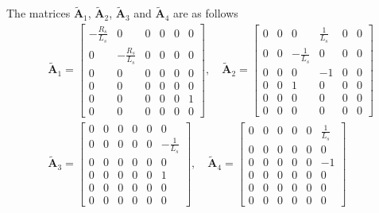 \documentclass[11pt,a4paper]{scrartcl}
\numberwithin{equation}{section}
\theoremstyle{it}
\theoremstyle{definition}
\begin{document}
\begin{onehalfspace}
The matrices $\tilde{\mathbf{A}}_1$, $\tilde{\mathbf{A}}_2$, 
$\tilde{\mathbf{A}}_3$ and $\tilde{\mathbf{A}}_4$ are as follows
\begin{equation}\label{pmsm_problem_1_eq_11}
	\begin{aligned}
		&\tilde{\mathbf{A}}_1 = 
		\begin{bmatrix} 
			-\frac{R_s}{L_s} & 0 & 0 & 0 & 0 & 0 \\[6pt]			
			0 & -\frac{R_s}{L_s} & 0 & 0 & 0 & 0 \\[6pt]
			0 & 0 & 0 & 0 & 0 & 0 \\[6pt]
			0 & 0 & 0 & 0 & 0 & 0 \\[6pt]
			0 & 0 & 0 & 0 & 0 & 1 \\[6pt]
			0 & 0 & 0 & 0 & 0 & 0
		\end{bmatrix},\quad
		\tilde{\mathbf{A}}_2 = 
		\begin{bmatrix} 
			0 & 0 & 0 & \frac{1}{L_s} & 0 & 0 \\[6pt]			
			0 & 0 & -\frac{1}{L_s} & 0 & 0 & 0 \\[6pt]
			0 & 0 & 0 & -1 & 0 & 0 \\[6pt]
			0 & 0 & 1 & 0 & 0 & 0 \\[6pt]
			0 & 0 & 0 & 0 & 0 & 0 \\[6pt]
			0 & 0 & 0 & 0 & 0 & 0
		\end{bmatrix} \\[8pt]
		&\tilde{\mathbf{A}}_3 = 
		\begin{bmatrix} 
			0 & 0 & 0 & 0 & 0 & 0 \\[6pt]			
			0 & 0 & 0 & 0 & 0 & -\frac{1}{L_s} \\[6pt]
			0 & 0 & 0 & 0 & 0 & 0 \\[6pt]
			0 & 0 & 0 & 0 & 0 & 1 \\[6pt]
			0 & 0 & 0 & 0 & 0 & 0 \\[6pt]
			0 & 0 & 0 & 0 & 0 & 0
		\end{bmatrix},\quad
		\tilde{\mathbf{A}}_4 = 
		\begin{bmatrix} 
			0 & 0 & 0 & 0 & 0 & \frac{1}{L_s} \\[6pt]			
			0 & 0 & 0 & 0 & 0 & 0 \\[6pt]
			0 & 0 & 0 & 0 & 0 & -1 \\[6pt]
			0 & 0 & 0 & 0 & 0 & 0 \\[6pt]
			0 & 0 & 0 & 0 & 0 & 0 \\[6pt]
			0 & 0 & 0 & 0 & 0 & 0
		\end{bmatrix} 
	\end{aligned}
\end{equation} 


\end{onehalfspace}
\end{document}
